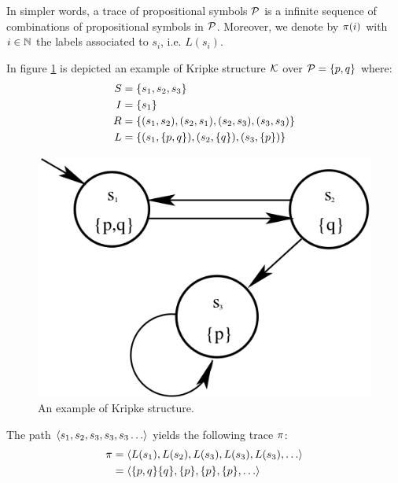 In simpler words, a trace of propositional symbols $\mathcal{P}$ is a infinite sequence of combinations of propositional symbols in $\mathcal{P}$. Moreover, we denote by $\pi(i)$ with $i\in\mathbb{N}$ the labels associated to $s_i$, i.e. $L(s_i)$.
\begin{example}\label{kripke-example}
	In figure \ref{kripke-fig-example} is depicted an example of Kripke structure $\mathcal{K}$ over $\mathcal{P} = \{p, q\}$ where:
	\begin{align*}
	S &= \{s_1, s_2, s_3\}\\
	I &= \{s_1\}\\
	R &= \{(s_1, s_2), (s_2, s_1), (s_2, s_3), (s_3, s_3)\}\\
	L &= \{(s_1, \{p, q\}), (s_2, \{q\}), (s_3, \{p\})\}
	\end{align*}
	 
	\begin{figure}[h]
		\centering	
		\includegraphics[width=.5\linewidth]{images/KripkeStructureExample}
		\caption{\label{kripke-fig-example}An example of Kripke structure.}
	\end{figure}
	
	The path $\tup{s_1, s_2, s_3, s_3, s_3\dots}$ yields the following trace $\pi$:
	\begin{align*}
	\trace &= \tup{L(s_1), L(s_2), L(s_3), L(s_3), L(s_3),\dots} \\
		&= \tup{\set{p, q}\set{q}, \set{p}, \set{p},\set{p}, \dots}
	\end{align*}
\end{example}


